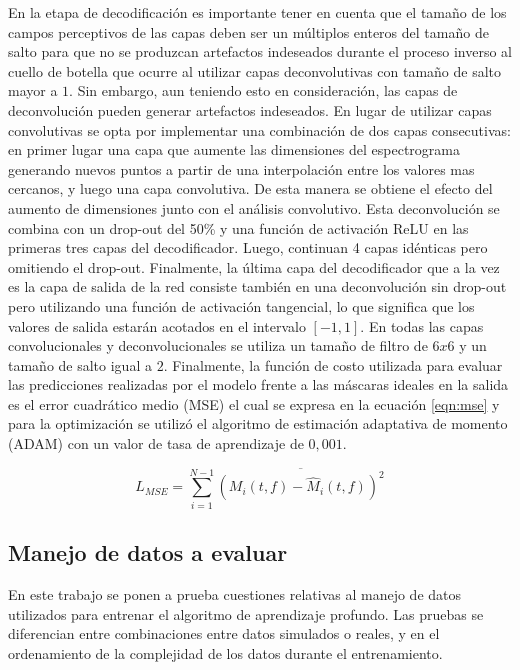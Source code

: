 En la etapa de decodificación es importante tener en cuenta que el tamaño de los campos perceptivos de las capas deben ser un múltiplos enteros del tamaño de salto para que no se produzcan artefactos indeseados durante el proceso inverso al cuello de botella que ocurre al utilizar capas deconvolutivas con tamaño de salto mayor a $1$. Sin embargo, aun teniendo esto en consideración, las capas de deconvolución pueden generar artefactos indeseados. En lugar de utilizar capas convolutivas se opta por implementar una combinación de dos capas consecutivas: en primer lugar una capa que aumente las dimensiones del espectrograma generando nuevos puntos a partir de una interpolación entre los valores mas cercanos, y luego una capa convolutiva. De esta manera se obtiene el efecto del aumento de dimensiones junto con el análisis convolutivo. Esta deconvolución se combina con un drop-out del 50\% y una función de activación ReLU en las primeras tres capas del decodificador. Luego, continuan 4 capas idénticas pero omitiendo el drop-out. Finalmente, la última capa del decodificador que a la vez es la capa de salida de la red consiste también en una deconvolución sin drop-out pero utilizando una función de activación tangencial, lo que significa que los valores de salida estarán acotados en el intervalo $[-1, 1]$.
En todas las capas convolucionales y deconvolucionales se utiliza un tamaño de filtro de $6x6$ y un tamaño de salto igual a $2$. 
Finalmente, la función de costo utilizada para evaluar las predicciones realizadas por el modelo frente a las máscaras ideales en la salida es el error cuadrático medio (MSE) el cual se expresa en la ecuación \ref{eqn:mse} y para la optimización se utilizó el algoritmo de estimación adaptativa de momento (ADAM) \cite{adam} con un valor de tasa de aprendizaje de $0,001$. 

\begin{equation}
\label{eqn:mse}
	L_{MSE} = \sum_{i=1}^{N-1}\overline{(M_{i}(t,f) - \hat{M}_{i}(t,f))^{2}} 
\end{equation}

\subsection{Manejo de datos a evaluar}
En este trabajo se ponen a prueba cuestiones relativas al manejo de datos utilizados para entrenar el algoritmo de aprendizaje profundo. Las pruebas se diferencian entre combinaciones entre datos simulados o reales, y en el ordenamiento de la complejidad de los datos durante el entrenamiento. 


